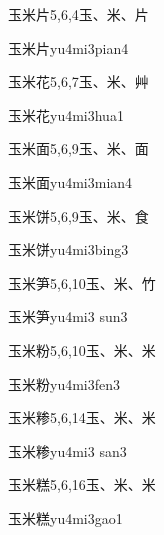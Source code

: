 \begin{Entry}{玉米片}{5,6,4}{⽟、⽶、⽚}
  \begin{Phonetics}{玉米片}{yu4mi3pian4}
  \end{Phonetics}
\end{Entry}

\begin{Entry}{玉米花}{5,6,7}{⽟、⽶、⾋}
  \begin{Phonetics}{玉米花}{yu4mi3hua1}
  \end{Phonetics}
\end{Entry}

\begin{Entry}{玉米面}{5,6,9}{⽟、⽶、⾯}
  \begin{Phonetics}{玉米面}{yu4mi3mian4}
  \end{Phonetics}
\end{Entry}

\begin{Entry}{玉米饼}{5,6,9}{⽟、⽶、⾷}
  \begin{Phonetics}{玉米饼}{yu4mi3bing3}
  \end{Phonetics}
\end{Entry}

\begin{Entry}{玉米笋}{5,6,10}{⽟、⽶、⽵}
  \begin{Phonetics}{玉米笋}{yu4mi3 sun3}
  \end{Phonetics}
\end{Entry}

\begin{Entry}{玉米粉}{5,6,10}{⽟、⽶、⽶}
  \begin{Phonetics}{玉米粉}{yu4mi3fen3}
  \end{Phonetics}
\end{Entry}

\begin{Entry}{玉米糁}{5,6,14}{⽟、⽶、⽶}
  \begin{Phonetics}{玉米糁}{yu4mi3 san3}
  \end{Phonetics}
\end{Entry}

\begin{Entry}{玉米糕}{5,6,16}{⽟、⽶、⽶}
  \begin{Phonetics}{玉米糕}{yu4mi3gao1}
  \end{Phonetics}
\end{Entry}


